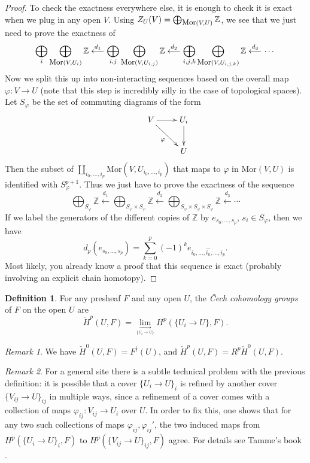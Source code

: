 \documentclass[letterpaper,11pt]{article}
\theoremstyle{definition}
\newtheorem{defn}{Definition}
\theoremstyle{remark}
\newtheorem{rmk}{Remark}
\begin{document}
\begin{proof}
To check the exactness everywhere else, it is enough to check it is exact when we plug in any open $V$. Using $Z_U(V) = \bigoplus_{\mbox{\small Mor}(V,U)} \mathbb{Z}$, we see that we just need to prove the exactness of
\[
\bigoplus_i \bigoplus_{\mbox{\small Mor}(V,U_i)} \mathbb{Z} \stackrel{d_1}{\longleftarrow} \bigoplus_{i,j}\bigoplus_{\mbox{\small Mor}(V,U_{i,j})} \mathbb{Z} \stackrel{d_2}{\longleftarrow} \bigoplus_{i,j,k}\bigoplus_{\mbox{\small Mor}(V,U_{i,j,k})} \mathbb{Z} \stackrel{d_3}{\longleftarrow} \cdots
\]
Now we split this up into non-interacting sequences based on the overall map $\varphi : V\rightarrow U$ (note that this step is incredibly silly in the case of topological spaces). Let $S_\varphi$ be the set of commuting diagrams of the form
\begin{align*}
\xymatrix{&V \ar[r] \ar[dr]_{\varphi} & U_i \ar[d]\\
& & U}
\end{align*}
Then the subset of $\coprod_{i_0, ..., i_p} \mbox{Mor}(V,U_{i_0, ..., i_p})$ that maps to $\varphi$ in $\mbox{Mor}(V,U)$ is identified with $S_\varphi^{p+1}$. Thus we just have to prove the exactness of the sequence
\[
\bigoplus_{S_\varphi} \mathbb{Z} \stackrel{d_1}{\longleftarrow} \bigoplus_{S_\varphi\times S_\varphi} \mathbb{Z} \stackrel{d_2}{\longleftarrow} \bigoplus_{S_\varphi\times S_\varphi\times S_\varphi} \mathbb{Z} \stackrel{d_3}{\longleftarrow} \cdots
\]
If we label the generators of the different copies of $\mathbb{Z}$ by $e_{s_0, ..., s_p}$, $s_i \in S_\varphi$, then we have
\[
d_p(e_{s_0, ..., s_p}) = \sum_{k=0}^p (-1)^k e_{i_0,...,\widehat{i_k}, ...,i_p}.
\]
Most likely, you already know a proof that this sequence is exact (probably involving an explicit chain homotopy).
\end{proof}

\begin{defn} For any presheaf $F$ and any open $U$, the \emph{\v{C}ech cohomology groups} of $F$ on the open $U$ are
\[
\check{H}^p(U,F) = \underset{\underset{\{U_i\rightarrow U\}}{\longrightarrow}}{\lim} H^p(\{U_i\rightarrow U\}, F).
\]
\end{defn}

\begin{rmk} We have $\check{H}^0(U,F) = F^\nmid(U)$, and $\check{H}^p(U,F) = R^p\check{H}^0(U,F)$.
\end{rmk}

\begin{rmk} For a general site there is a subtle technical problem with the previous definition: it is possible that a cover $\{U_i\rightarrow U\}_i$ is refined by another cover $\{V_{ij}\rightarrow U\}_{ij}$ in multiple ways, since a refinement of a cover comes with a collection of maps $\varphi_{ij}:V_{ij}\rightarrow U_i$ over $U$. In order to fix this, one shows that for any two such collections of maps $\varphi_{ij}, \varphi_{ij}'$, the two induced maps from $H^p(\{U_i\rightarrow U\}_i,F)$ to $H^p(\{V_{ij}\rightarrow U\}_{ij},F)$ agree. For details see Tamme's book \cite{etale}.
\end{rmk}
\end{document}
